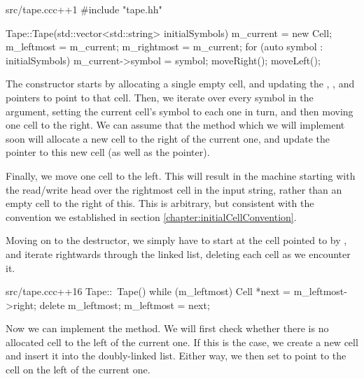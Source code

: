 \begin{file}{src/tape.cc}{c++}{1}
#include "tape.hh"

Tape::Tape(std::vector<std::string> initialSymbols)
{
    m_current = new Cell;
    m_leftmost = m_current;
    m_rightmost = m_current;
    for (auto symbol : initialSymbols)
    {
        m_current->symbol = symbol;
        moveRight();
    }
    moveLeft();
}
\end{file}

The constructor starts by allocating a single empty cell, and updating the , , and  pointers to point to that cell. Then, we iterate over every symbol in the argument, setting the current cell's symbol to each one in turn, and then moving one cell to the right. We can assume that the  method which we will implement soon will allocate a new cell to the right of the current one, and update the  pointer to this new cell (as well as the  pointer).

Finally, we move one cell to the left. This will result in the machine starting with the read/write head over the rightmost cell in the input string, rather than an empty cell to the right of this. This is arbitrary, but consistent with the convention we established in section \ref{chapter:initialCellConvention}.

Moving on to the destructor, we simply have to start at the cell pointed to by , and iterate rightwards through the linked list, deleting each cell as we encounter it.

\begin{file}{src/tape.cc}{c++}{16}
Tape::~Tape()
{
    while (m_leftmost)
    {
        Cell *next = m_leftmost->right;
        delete m_leftmost;
        m_leftmost = next;
    }
}
\end{file}

Now we can implement the  method. We will first check whether there is no allocated cell to the left of the current one. If this is the case, we create a new cell and insert it into the doubly-linked list. Either way, we then set  to point to the cell on the left of the current one.

\begin{file}{src/tape.cc}{c++}{26}
void Tape::moveLeft(void)
{
    if (!(m_current->left))
    {
        m_current->left = new Cell;
        m_current->left->right = m_current;
        m_leftmost = m_current->left;
    }
    m_current = m_current->left;
\end{file}

